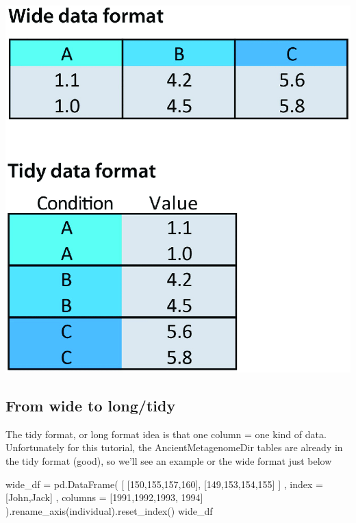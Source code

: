 \documentclass[
  letterpaper,
]{book}
\newenvironment{Shaded}{}{}
\newcommand{\DecValTok}[1]{\textcolor[rgb]{0.00,0.36,0.77}{#1}}
\newcommand{\NormalTok}[1]{\textcolor[rgb]{0.14,0.16,0.18}{#1}}
\newcommand{\OperatorTok}[1]{\textcolor[rgb]{0.14,0.16,0.18}{#1}}
\newcommand{\StringTok}[1]{\textcolor[rgb]{0.01,0.18,0.38}{#1}}
\begin{document}
\includegraphics{assets/images/chapters/introduction-to-python/The-wide-versus-tidy-data-format-In-the-wide-spreadsheet-like-data-format-each-column.png}

\hypertarget{from-wide-to-longtidy}{%
\subsection{From wide to long/tidy}\label{from-wide-to-longtidy}}

The tidy format, or long format idea is that one column = one kind of
data.\\
Unfortunately for this tutorial, the AncientMetagenomeDir tables are
already in the tidy format (good), so we'll see an example or the wide
format just below

\begin{Shaded}
\begin{Highlighting}[]
\NormalTok{wide\_df }\OperatorTok{=}\NormalTok{ pd.DataFrame(}
\NormalTok{    [}
\NormalTok{    [}\DecValTok{150}\NormalTok{,}\DecValTok{155}\NormalTok{,}\DecValTok{157}\NormalTok{,}\DecValTok{160}\NormalTok{],}
\NormalTok{    [}\DecValTok{149}\NormalTok{,}\DecValTok{153}\NormalTok{,}\DecValTok{154}\NormalTok{,}\DecValTok{155}\NormalTok{]}
\NormalTok{    ]}
\NormalTok{    , index }\OperatorTok{=}\NormalTok{ [}\StringTok{\textquotesingle{}John\textquotesingle{}}\NormalTok{,}\StringTok{\textquotesingle{}Jack\textquotesingle{}}\NormalTok{]}
\NormalTok{    , columns }\OperatorTok{=}\NormalTok{ [}\DecValTok{1991}\NormalTok{,}\DecValTok{1992}\NormalTok{,}\DecValTok{1993}\NormalTok{, }\DecValTok{1994}\NormalTok{]}
\NormalTok{).rename\_axis(}\StringTok{\textquotesingle{}individual\textquotesingle{}}\NormalTok{).reset\_index()}
\NormalTok{wide\_df}
\end{Highlighting}
\end{Shaded}
\end{document}
